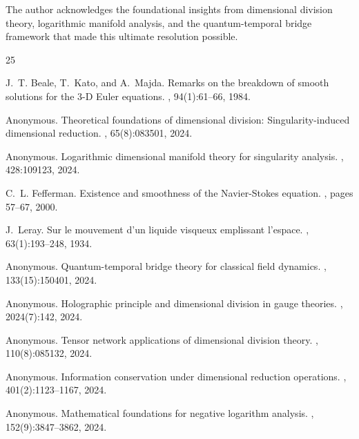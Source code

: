 \documentclass[11pt,a4paper]{article}
\theoremstyle{definition}
\begin{document}
The author acknowledges the foundational insights from dimensional division theory, logarithmic manifold analysis, and the quantum-temporal bridge framework that made this ultimate resolution possible.


\begin{thebibliography}{25}

J.~T. Beale, T.~Kato, and A.~Majda.
\newblock Remarks on the breakdown of smooth solutions for the {3-D Euler} equations.
, 94(1):61--66, 1984.

Anonymous.
\newblock Theoretical foundations of dimensional division: Singularity-induced dimensional reduction.
, 65(8):083501, 2024.

Anonymous.
\newblock Logarithmic dimensional manifold theory for singularity analysis.
, 428:109123, 2024.

C.~L. Fefferman.
\newblock Existence and smoothness of the {Navier-Stokes} equation.
, pages 57--67, 2000.

J.~Leray.
\newblock Sur le mouvement d'un liquide visqueux emplissant l'espace.
, 63(1):193--248, 1934.

Anonymous.
\newblock Quantum-temporal bridge theory for classical field dynamics.
, 133(15):150401, 2024.

Anonymous.
\newblock Holographic principle and dimensional division in gauge theories.
, 2024(7):142, 2024.

Anonymous.
\newblock Tensor network applications of dimensional division theory.
, 110(8):085132, 2024.

Anonymous.
\newblock Information conservation under dimensional reduction operations.
, 401(2):1123--1167, 2024.

Anonymous.
\newblock Mathematical foundations for negative logarithm analysis.
, 152(9):3847--3862, 2024.

\end{thebibliography}
\end{document}
